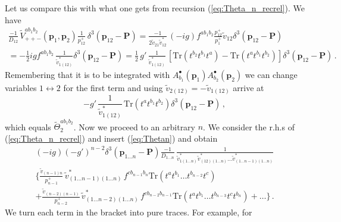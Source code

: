 \documentclass[english,american]{article}
\begin{document}
Let us compare this with what one gets from recursion (\ref{eq:Theta_n_recrel}).
We have
\begin{multline}
\frac{-1}{D_{12}}\,\tilde{V}_{++-}^{ab_{1}b_{2}}\left(\mathbf{p}_{1},\mathbf{p}_{2}\right)\frac{1}{p_{12}^{+}}\,\delta^{3}\left(\mathbf{p}_{12}-\mathbf{P}\right)=\frac{-1}{2\tilde{v}_{21}\tilde{v}_{12}^{*}}\,\left(-ig\right)f^{ab_{1}b_{2}}\frac{p_{12}^{+}}{p_{1}^{+}}\tilde{v}_{12}\delta^{3}\left(\mathbf{p}_{12}-\mathbf{P}\right)\\
=-\frac{1}{2}igf^{ab_{1}b_{2}}\,\frac{1}{\tilde{v}_{1\left(12\right)}^{*}}\delta^{3}\left(\mathbf{p}_{12}-\mathbf{P}\right)=\frac{1}{2}\, g'\,\frac{1}{\tilde{v}_{1\left(12\right)}^{*}}\,\left[\mathrm{Tr}\left(t^{b_{2}}t^{b_{1}}t^{a}\right)-\mathrm{Tr}\left(t^{a}t^{b_{1}}t^{b_{2}}\right)\right]\delta^{3}\left(\mathbf{p}_{12}-\mathbf{P}\right)\,.
\end{multline}
Remembering that it is to be integrated with $A_{b_{1}}^{\bullet}\left(\mathbf{p}_{1}\right)A_{b_{2}}^{\bullet}\left(\mathbf{p}_{2}\right)$
we can change variables $1\leftrightarrow2$ for the first term and
using $\tilde{v}_{2\left(12\right)}=-\tilde{v}_{1\left(12\right)}$
arrive at
\begin{equation}
-g'\,\frac{1}{\tilde{v}_{1\left(12\right)}^{*}}\,\mathrm{Tr}\left(t^{a}t^{b_{1}}t^{b_{2}}\right)\delta^{3}\left(\mathbf{p}_{12}-\mathbf{P}\right)\,,
\end{equation}
which equals $\tilde{\Theta}_{2}^{ab_{1}b_{2}}$. Now we proceed to
an arbitrary $n$. We consider the r.h.s of (\ref{eq:Theta_n_recrel})
and insert (\ref{eq:Thetan}) and obtain
\begin{multline}
\left(-ig\right)\left(-g'\right)^{n-2}\delta^{3}\left(\mathbf{p}_{1\dots n}-\mathbf{P}\right)\frac{-1}{D_{1\dots n}}\,\frac{1}{\tilde{v}_{1\left(1\dots n\right)}^{*}\tilde{v}_{\left(12\right)\left(1\dots n\right)}^{*}\dots\tilde{v}_{\left(1\dots n-1\right)\left(1\dots n\right)}^{*}}\\
\Bigg\{\frac{\tilde{v}_{\left(n-1\right)n}}{p_{n-1}^{+}}\,\tilde{v}_{\left(1\dots n-1\right)\left(1\dots n\right)}^{*}\, f^{cb_{n-1}b_{n}}\mathrm{Tr}\left(t^{a}t^{b_{1}}\dots t^{b_{n-2}}t^{c}\right)\\
+\frac{\tilde{v}_{\left(n-2\right)\left(n-1\right)}}{p_{n-2}^{+}}\,\tilde{v}_{\left(1\dots n-2\right)\left(1\dots n\right)}^{*}\, f^{cb_{n-2}b_{n-1}}\mathrm{Tr}\left(t^{a}t^{b_{1}}\dots t^{b_{n-3}}t^{c}t^{b_{n}}\right)+\dots\Bigg\}\,.
\end{multline}
We turn each term in the bracket into pure traces. For example, for
\end{document}
